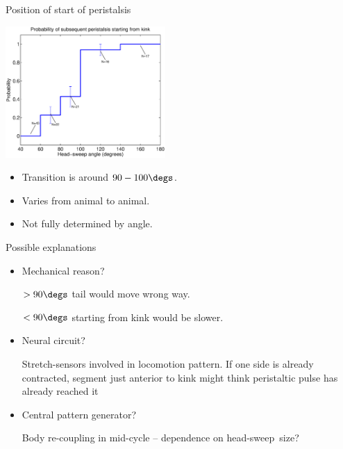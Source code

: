\documentclass{beamer}%
\newcommand{\hs}{head-sweep}
\begin{document}

\begin{frame}{Position of start of peristalsis}
%
 \begin{center}
   \includegraphics[height=5cm]{Figs/ProbKink.eps}
 \end{center}

 \begin{itemize}
 \item Transition is around $90-100\degs$.
 \item Varies from animal to animal.
 \item Not fully determined by angle.
 \end{itemize}
%
\end{frame}


\begin{frame}{Possible explanations}
%
 \begin{itemize}
   \item Mechanical reason?

   $>90\degs$ tail would move wrong way.

   $<90\degs$ starting from kink would be slower.
   \vp

   \item Neural circuit?

   Stretch-sensors involved in locomotion pattern. If one side is already contracted, segment just anterior to kink might think peristaltic pulse has already reached it
   \vp

   \item Central pattern generator?

   Body re-coupling in mid-cycle -- dependence on \hs\ size?
 \end{itemize}
%
\end{frame}

\end{document}
